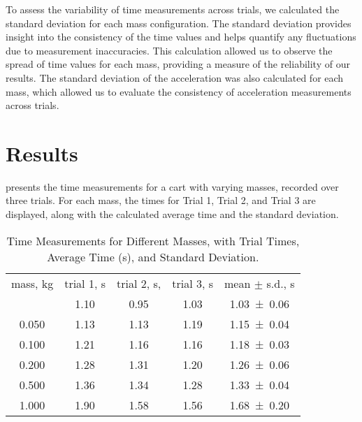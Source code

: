 ﻿\documentclass[reprint,amsmath,amssymb,aps]{revtex4-2}
\begin{document}
To assess the variability of time measurements across trials, we calculated the standard deviation for each mass configuration. The standard deviation provides insight into the consistency of the time values and helps quantify any fluctuations due to measurement inaccuracies. This calculation allowed us to observe the spread of time values for each mass, providing a measure of the reliability of our results. The standard deviation of the acceleration was also calculated for each mass, which allowed us to evaluate the consistency of acceleration measurements across trials.






\section{Results}

 presents the time measurements for a cart with varying masses, recorded over three trials. For each mass, the times for Trial 1, Trial 2, and Trial 3 are displayed, along with the calculated average time and the standard deviation. 
\begin{table}
\caption{\label{tab:fig3}Time Measurements for Different Masses, with Trial Times, Average Time (s), and Standard Deviation.}
\begin{center}
\begin{ruledtabular}
\begin{tabular}{ccccc}
mass, \unit{\kilo\gram} & trial 1, \unit{\second} & trial 2, \unit{\second}, & trial 3, \unit{\second} & mean $\pm$ s.d., \unit{\second} \\
\colrule
0.020 & 1.10 & 0.95 & 1.03 & \num{1.03\pm0.06} \\
0.050 & 1.13 & 1.13 & 1.19 & \num{1.15\pm0.04} \\
0.100 & 1.21 & 1.16 & 1.16 & \num{1.18\pm0.03} \\
0.200 & 1.28 & 1.31 & 1.20 & \num{1.26\pm0.06} \\
0.500 & 1.36 & 1.34 & 1.28 & \num{1.33\pm0.04} \\
1.000 & 1.90 & 1.58 & 1.56 & \num{1.68\pm0.20} \\
\end{tabular}
\end{ruledtabular}
\end{center}
\end{table}
\end{document}
